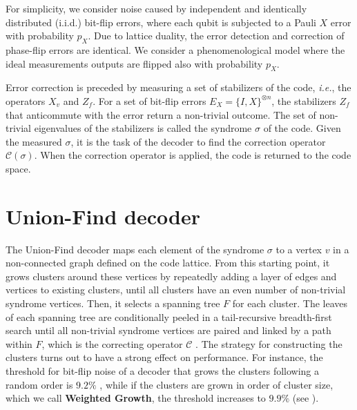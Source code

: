 For simplicity, we consider noise caused by independent and identically distributed (i.i.d.) bit-flip errors, where each qubit is subjected to a Pauli $X$ error with probability $p_X$. Due to {lattice duality}, the error detection and correction of phase-flip errors are identical. We consider a phenomenological model where the ideal measurements outputs are flipped also with probability $p_X$. 

Error correction is preceded by measuring a set of stabilizers of the code, \emph{i.e.}, the operators $X_v$ and $Z_f$. For a set of bit-flip errors $E_X = \{I,X\}^{\otimes n}$, the stabilizers $Z_f$ that anticommute with the error return a non-trivial outcome. The set of non-trivial eigenvalues of the stabilizers is called the syndrome $\sigma$ of the code. Given the measured $\sigma$, it is the task of the decoder to find the correction operator $\mathcal{C}(\sigma)$. When the correction operator is applied, the code is returned to the code space. %

\section{Union-Find decoder}\label{sec:unionfind}
The Union-Find decoder \cite{delfosse2017almost} maps each element of the syndrome $\sigma$ to a vertex $v$ in a non-connected graph defined on the code lattice. From this starting point, it grows clusters around these vertices by repeatedly adding a layer of edges and vertices to existing clusters, until all clusters have an even number of non-trivial syndrome vertices. %
Then, it selects a spanning tree $F$ for each cluster. %
The leaves of each spanning tree are conditionally peeled in a tail-recursive breadth-first search until all non-trivial syndrome vertices are paired and linked by a path within $F$, which is the correcting operator $\mathcal{C}$ \cite{delfosse2017almost}. The strategy for constructing the clusters turns out to have a strong effect on performance. For instance, the threshold for bit-flip noise of a decoder that grows the clusters following a random order is $9.2\%$ \cite{delfosse2017almost}, while if the clusters are grown in order of cluster size, which we call \textbf{Weighted Growth}, the threshold increases to $9.9\%$ (see )\cite{delfosse2017almost}. %

